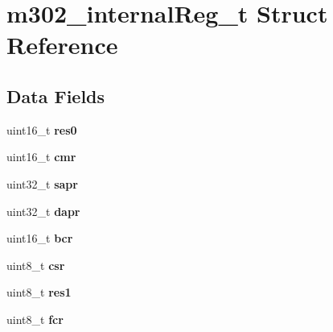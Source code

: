 \hypertarget{structm302__internalReg__t}{}\section{m302\+\_\+internal\+Reg\+\_\+t Struct Reference}
\label{structm302__internalReg__t}
\subsection*{Data Fields}
\begin{DoxyCompactItemize}
\item 
\mbox{\label{structm302__internalReg__t_ac53bbf43154911d0c0b13c22ace56e9b}} 
uint16\+\_\+t {\bfseries res0}
\item 
\mbox{\label{structm302__internalReg__t_a50c502ef8b095d86c0db61b2887a4404}} 
uint16\+\_\+t {\bfseries cmr}
\item 
\mbox{\label{structm302__internalReg__t_a31d0b214215a4b15daf570a122f97d4a}} 
uint32\+\_\+t {\bfseries sapr}
\item 
\mbox{\label{structm302__internalReg__t_a1f840ed583abd9871d8e3f625bb8dac4}} 
uint32\+\_\+t {\bfseries dapr}
\item 
\mbox{\label{structm302__internalReg__t_a677e2776dbb7aa64b209a668fa2680fd}} 
uint16\+\_\+t {\bfseries bcr}
\item 
\mbox{\label{structm302__internalReg__t_a52589509ec22938f2eaf2ccf3bacd48e}} 
uint8\+\_\+t {\bfseries csr}
\item 
\mbox{\label{structm302__internalReg__t_ab063d0c3b9546e1612200d2b59479c03}} 
uint8\+\_\+t {\bfseries res1}
\item 
\mbox{\label{structm302__internalReg__t_a5e0c21052d60e2c77c34cb3855e96fc6}} 
uint8\+\_\+t {\bfseries fcr}
\item 
\mbox{\label{structm302__internalReg__t_a9a153b64986f63e57c243c2df4f5cb5f}} 

\end{DoxyCompactItemize}
